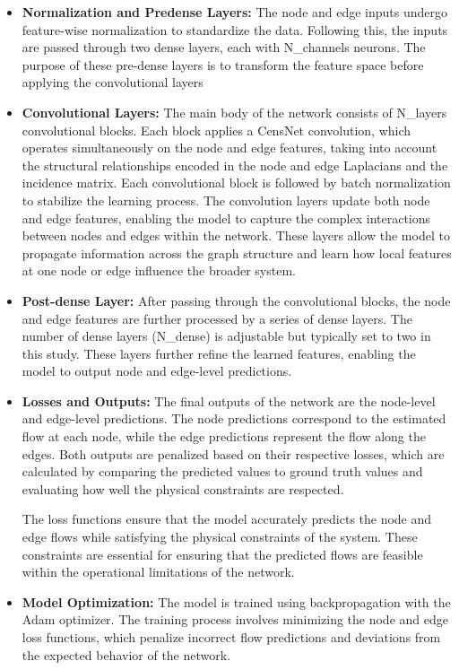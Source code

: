 \begin{itemize}
    \item \textbf{Normalization and Pre\-dense Layers:} The node and edge inputs undergo feature-wise normalization to standardize the data. Following this, the inputs are passed through two dense layers, each with N\_channels neurons. The purpose of these pre-dense layers is to transform the feature space before applying the convolutional layers 
    \item \textbf{Convolutional Layers:} The main body of the network consists of N\_layers convolutional blocks. Each block applies a CensNet convolution, which operates simultaneously on the node and edge features, taking into account the structural relationships encoded in the node and edge Laplacians and the incidence matrix. Each convolutional block is followed by batch normalization to stabilize the learning process. 
 The convolution layers update both node and edge features, enabling the model to capture the complex interactions between nodes and edges within the network. These layers allow the model to propagate information across the graph structure and learn how local features at one node or edge influence the broader system.   
    \item \textbf{Post-dense Layer:} After passing through the convolutional blocks, the node and edge features are further processed by a series of dense layers. The number of dense layers (N\_dense) is adjustable but typically set to two in this study. These layers further refine the learned features, enabling the model to output node and edge-level predictions. 
    \item \textbf{Losses and Outputs:} The final outputs of the network are the node-level and edge-level predictions. The node predictions correspond to the estimated flow at each node, while the edge predictions represent the flow along the edges. Both outputs are penalized based on their respective losses, which are calculated by comparing the predicted values to ground truth values and evaluating how well the physical constraints are respected.

The loss functions ensure that the model accurately predicts the node and edge flows while satisfying the physical constraints of the system. These constraints are essential for ensuring that the predicted flows are feasible within the operational limitations of the network. 
    \item \textbf{Model Optimization:} The model is trained using backpropagation with the Adam optimizer. The training process involves minimizing the node and edge loss functions, which penalize incorrect flow predictions and deviations from the expected behavior of the network.

\begin{figure}
    \centering
    \setlength{}        
    \setlength{}
    \resizebox{\figurewidth}{\figureheight}{}
    \caption{}\label{fig:}
\end{figure}
\end{itemize}


